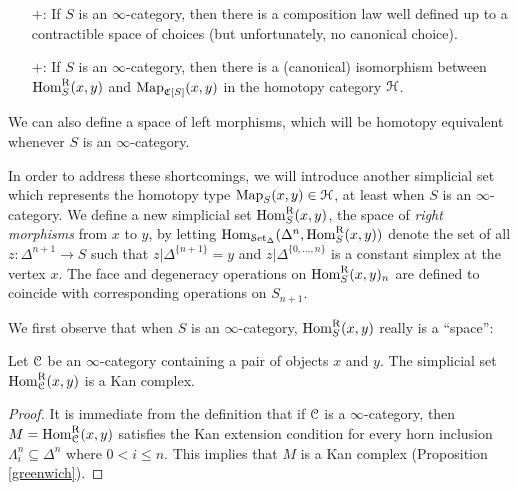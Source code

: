 \begin{1.2.2 Mapping spaces}
\begin{shaded}
\begin{enumerate}
\item[$+$:] If $S$ is an $\infty$-category, then there is a composition law well defined up to a contractible space of choices (but unfortunately, no canonical choice).
\item[$+$:] If $S$ is an $\infty$-category, then 
there is a 
(canonical) isomorphism between $\operatorname{Hom}^{\operatorname{R}}_{S}(x,y)$ and $\operatorname{{Map}}_{\operatorname{\mathfrak{C}}[S]}(x,y)$
in the homotopy category $\operatorname{\mathcal{H}}$.
\end{enumerate}
We can also define a space of left morphisms, which will be homotopy equivalent whenever $S$ is an $\infty$-category.
\end{shaded}

In order to address these shortcomings, we will introduce another simplicial set which
represents the homotopy type $\operatorname{{Map}}_{S}(x,y) \in \operatorname{\mathcal{H}}$, at least when $S$ is an $\infty$-category. 
We define a new simplicial
set $\operatorname{Hom}^{\operatorname{R}}_S(x,y)$, the space of {\it right morphisms} from
$x$ to $y$, by letting $\operatorname{Hom}_{\operatorname{\mathcal{S}et_{\Delta}}}( \Delta^n, \operatorname{Hom}^{\operatorname{R}}_S(x,y))$ denote the set of
all $z: \Delta^{n+1} \rightarrow S$ such that $z| \Delta^{ \{n+1 \}} = y$ and $z|
\Delta^{ \{0, \ldots, n\} }$ is a constant simplex at the vertex
$x$. The face and degeneracy operations on
$\operatorname{Hom}^{\operatorname{R}}_S(x,y)_n$ are defined to coincide with corresponding operations on 
$S_{n+1}$.

We first observe that when $S$ is an $\infty$-category, $\operatorname{Hom}^{\operatorname{R}}_S(x,y)$ really is a ``space'':

\begin{proposition}\label{gura}
Let $\operatorname{\mathcal{C}}$ be an $\infty$-category containing a pair of objects $x$ and $y$. The simplicial set
$\operatorname{Hom}^{\operatorname{R}}_{\operatorname{\mathcal{C}}}(x,y)$ is a Kan complex.
\end{proposition}

\begin{proof}
It is immediate from the definition that if $\operatorname{\mathcal{C}}$ is a
$\infty$-category, then $M=\operatorname{Hom}^{\operatorname{R}}_{\operatorname{\mathcal{C}}}(x,y)$ satisfies the Kan
extension condition for every horn inclusion $\Lambda^n_i
\subseteq \Delta^n$ where $0 < i \leq n$. This implies that $M$ is
a Kan complex (Proposition \ref{greenwich}).
\end{proof}


\end{1.2.2 Mapping spaces}
